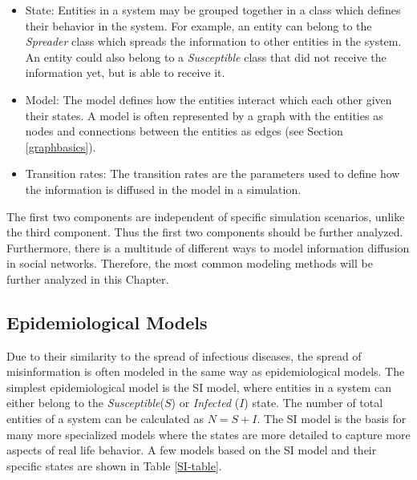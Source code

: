 \begin{itemize}
    \item State: Entities in a system may be grouped together in a class which
    defines their behavior in the system. For example, 
    an entity can belong to the \textit{Spreader} class which 
    spreads the information
    to other entities in the system. An entity could also belong to a
    \textit{Susceptible} class that did not receive the information yet, 
    but is able to receive it.
    \item Model: The model defines how the entities interact which each other
    given their states. A model is often represented by a graph with the entities
    as nodes and connections between the entities as edges 
    (see Section \ref{graphbasics}).
    \item Transition rates: The transition rates are the parameters used
    to define how the information is diffused in the model in a simulation. 
\end{itemize}

The first two components are independent of specific simulation scenarios,
unlike the third component. Thus the first two components should be further
analyzed. Furthermore, there is a multitude of different ways 
to model information diffusion in social networks. Therefore, the most common
modeling methods will be further analyzed in this Chapter.

\subsection{Epidemiological Models}
\label{epidemologicalmodels}

Due to their similarity to the spread of infectious diseases, 
the spread of misinformation is often modeled in the same way as epidemiological models.
The simplest epidemiological model is the SI model, where entities in a system
can either belong to the \textit{Susceptible}($S$) or 
\textit{Infected} ($I$) state. The number of total entities of a 
system can be calculated as $N=S+I$. The SI model is the basis for many
more specialized models where the states are more detailed to capture more 
aspects of real life behavior. A few models based on the SI model and their 
specific states are shown in Table \ref{SI-table}.


